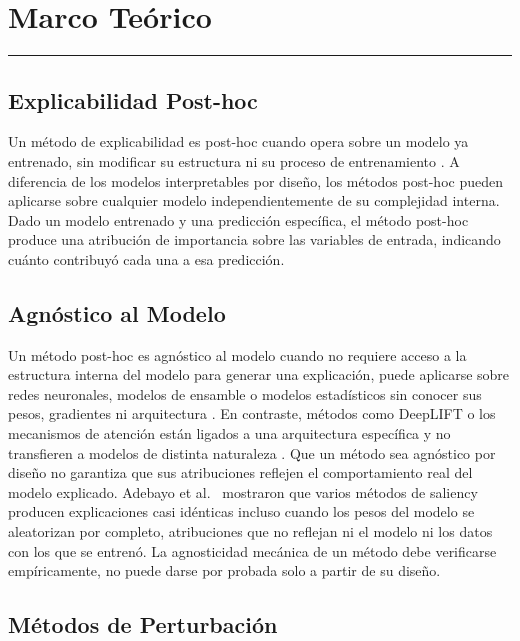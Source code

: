\chapter{Marco Teórico}
\hrule \bigskip \vspace*{1cm}

\label{chap:marco_teorico}

\section{Explicabilidad Post-hoc}

Un método de explicabilidad es post-hoc cuando opera sobre un modelo ya entrenado, sin modificar su estructura ni su proceso de entrenamiento \cite{arsenault2025}. A diferencia de los modelos interpretables por diseño, los métodos post-hoc pueden aplicarse sobre cualquier modelo independientemente de su complejidad interna. Dado un modelo entrenado y una predicción específica, el método post-hoc produce una atribución de importancia sobre las variables de entrada, indicando cuánto contribuyó cada una a esa predicción.

\section{Agnóstico al Modelo}

Un método post-hoc es agnóstico al modelo cuando no requiere acceso a la estructura interna del modelo para generar una explicación, puede aplicarse sobre redes neuronales, modelos de ensamble o modelos estadísticos sin conocer sus pesos, gradientes ni arquitectura \cite{arsenault2025}. En contraste, métodos como DeepLIFT o los mecanismos de atención están ligados a una arquitectura específica y no transfieren a modelos de distinta naturaleza \cite{schlegel2019}. Que un método sea agnóstico por diseño no garantiza que sus atribuciones reflejen el comportamiento real del modelo explicado. Adebayo et al.\ \cite{adebayo2018} mostraron que varios métodos de saliency producen explicaciones casi idénticas incluso cuando los pesos del modelo se aleatorizan por completo, atribuciones que no reflejan ni el modelo ni los datos con los que se entrenó. La agnosticidad mecánica de un método debe verificarse empíricamente, no puede darse por probada solo a partir de su diseño.

\section{Métodos de Perturbación}

